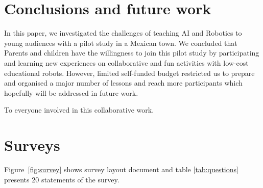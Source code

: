 \documentclass[sigconf,anonymous,review]{acmart}
\begin{document}
\section{Conclusions and future work}
In this paper, we investigated the challenges of teaching AI and Robotics to young audiences with a pilot study in a Mexican town. We concluded that Parents and children have the willingness to join this pilot study by participating and learning new experiences on collaborative and fun activities with low-cost educational robots. However, limited self-funded budget restricted us to prepare and  organised a major number of lessons and reach more participants which hopefully will be addressed in future work.




\begin{acks}
To everyone involved in this collaborative work.
\end{acks}



\appendix

\section{Surveys}
Figure~\ref{fig:survey} shows survey layout document and 
table \ref{tab:questions} presents 20 statements of the survey.
\end{document}
